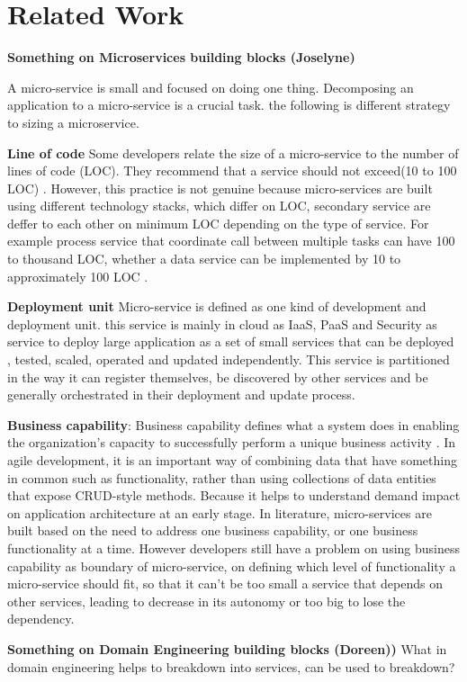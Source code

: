 \section{Related Work} \label{Related Work}
\textbf{Something on Microservices building blocks (Joselyne)}

A micro-service is small and focused on doing one thing. Decomposing an application to a micro-service is a crucial task. the following is different strategy to sizing a microservice.

\textbf{Line of code} Some developers relate the size of a micro-service to the number of lines of code (LOC). They recommend that a service should not exceed(10 to 100 LOC) \cite{schermann2015all}. However, this practice is not genuine because micro-services are built using different technology stacks, which differ on LOC, secondary service are deffer to each other on minimum LOC depending on the type of service. For example process service that coordinate call between multiple tasks can have 100 to thousand LOC, whether a data service can be implemented by 10 to approximately 100 LOC . 

\textbf{Deployment unit} Micro-service is defined as one kind of development and deployment unit. this service is mainly in cloud as IaaS, PaaS and Security as service to deploy large application as a set of small services that can be deployed , tested, scaled, operated and updated independently. This service is partitioned in the way it can register themselves, be discovered by other services and be generally orchestrated in their deployment and update process\cite{Villamizar2016}.

\textbf{Business capability}: Business capability defines what a system does in enabling the organization's capacity to successfully perform a unique business activity \cite{ulrich2016business}. In agile development, it is an important way of combining data that have something in common such as functionality, rather than using collections of data entities that expose CRUD-style methods. Because it helps to understand demand impact on application architecture at an early stage. In literature, micro-services are built based on the need to address one business capability, or one business functionality at a time. However developers still have a problem on using business capability as boundary of micro-service, on defining which level of functionality a micro-service should fit, so that it can't be too small a service that depends on other services, leading to decrease in its autonomy or too big to lose the dependency.



\textbf{Something on Domain Engineering building blocks (Doreen))}
What in domain engineering helps to breakdown into services, can be used to breakdown?
